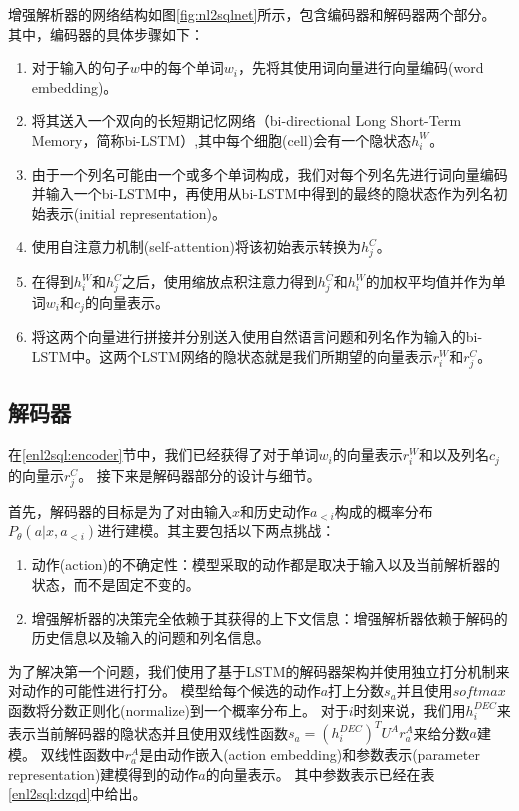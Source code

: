 增强解析器的网络结构如图\ref{fig:nl2sqlnet}所示，包含编码器和解码器两个部分。
其中，编码器的具体步骤如下：
\begin{enumerate}
  \item 对于输入的句子$w$中的每个单词$w_i$，先将其使用词向量进行向量编码(word embedding)。
  \item 将其送入一个双向的长短期记忆网络（bi-directional Long Short-Term Memory，简称bi-LSTM）,其中每个细胞(cell)会有一个隐状态$h^W_i$。
  \item 由于一个列名可能由一个或多个单词构成，我们对每个列名先进行词向量编码并输入一个bi-LSTM中，再使用从bi-LSTM中得到的最终的隐状态作为列名初始表示(initial representation)。
  \item 使用自注意力机制(self-attention\cite{vaswani2017attention})将该初始表示转换为$h^C_j$。
  \item 在得到$h^W_i$和$h^C_j$之后，使用缩放点积注意力\cite{vaswani2017attention}得到$h^C_j$和$h^W_i$的加权平均值并作为单词$w_i$和$c_j$的向量表示。
  \item 将这两个向量进行拼接并分别送入使用自然语言问题和列名作为输入的bi-LSTM中。这两个LSTM网络的隐状态就是我们所期望的向量表示$r^W_i$和$r^C_j$。
\end{enumerate}


\subsection{解码器}
\label{enl2sql:decoder}

在\ref{enl2sql:encoder}节中，我们已经获得了对于单词$w_i$的向量表示$r^W_i$和以及列名$c_j$的向量示$r^C_j$。
接下来是解码器部分的设计与细节。

首先，解码器的目标是为了对由输入$x$和历史动作$a_{<i}$构成的概率分布$P_{\theta}(a|x,a_{<i})$进行建模。其主要包括以下两点挑战：
\begin{enumerate}
  \item 动作(action)的不确定性：模型采取的动作都是取决于输入以及当前解析器的状态，而不是固定不变的。
  \item 增强解析器的决策完全依赖于其获得的上下文信息：增强解析器依赖于解码的历史信息以及输入的问题和列名信息。
\end{enumerate}

为了解决第一个问题，我们使用了基于LSTM的解码器架构并使用独立打分机制来对动作的可能性进行打分。
模型给每个候选的动作$a$打上分数$s_a$并且使用$softmax$函数将分数正则化(normalize)到一个概率分布上。
对于$i$时刻来说，我们用$h^{DEC}_i$来表示当前解码器的隐状态并且使用双线性函数$s_a = (h^{DEC}_i)^T U^A r^A_a$来给分数$a$建模。
双线性函数中$r^A_a$是由动作嵌入(action embedding)和参数表示(parameter representation)建模得到的动作$a$的向量表示。
其中参数表示已经在表\ref{enl2sql:dzqd}中给出。

